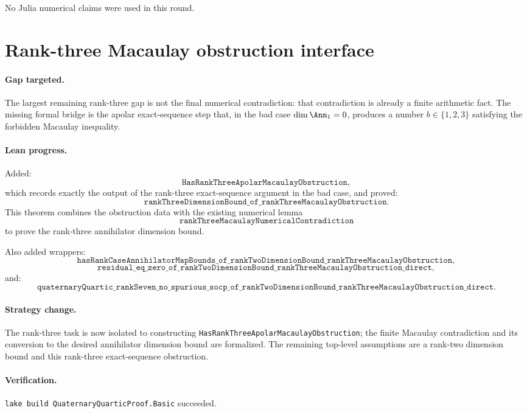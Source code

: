 \documentclass[11pt]{article}
\begin{document}
No Julia numerical claims were used in this round.

\section*{Rank-three Macaulay obstruction interface}

\paragraph{Gap targeted.}
The largest remaining rank-three gap is not the final numerical contradiction:
that contradiction is already a finite arithmetic fact.  The missing formal
bridge is the apolar exact-sequence step that, in the bad case
\(\dim\Ann_1=0\), produces a number \(b\in\{1,2,3\}\) satisfying the forbidden
Macaulay inequality.

\paragraph{Lean progress.}
Added:
\[
\texttt{HasRankThreeApolarMacaulayObstruction},
\]
which records exactly the output of the rank-three exact-sequence argument in
the bad case, and proved:
\[
\texttt{rankThreeDimensionBound\_of\_rankThreeMacaulayObstruction}.
\]
This theorem combines the obstruction data with the existing numerical lemma
\[
\texttt{rankThreeMacaulayNumericalContradiction}
\]
to prove the rank-three annihilator dimension bound.

Also added wrappers:
\[
\texttt{hasRankCaseAnnihilatorMapBounds\_of\_rankTwoDimensionBound\_rankThreeMacaulayObstruction},
\]
\[
\texttt{residual\_eq\_zero\_of\_rankTwoDimensionBound\_rankThreeMacaulayObstruction\_direct},
\]
and:
\[
\texttt{quaternaryQuartic\_rankSeven\_no\_spurious\_socp\_of\_rankTwoDimensionBound\_rankThreeMacaulayObstruction\_direct}.
\]

\paragraph{Strategy change.}
The rank-three task is now isolated to constructing
\texttt{HasRankThreeApolarMacaulayObstruction}; the finite Macaulay
contradiction and its conversion to the desired annihilator dimension bound
are formalized.  The remaining top-level assumptions are a rank-two dimension
bound and this rank-three exact-sequence obstruction.

\paragraph{Verification.}
\texttt{lake build QuaternaryQuarticProof.Basic} succeeded.
\end{document}
